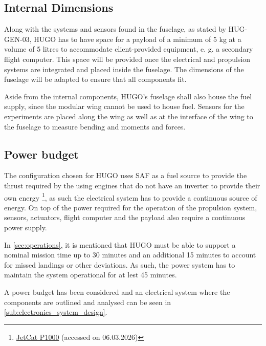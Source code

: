 \subsection{Internal Dimensions}
Along with the systems and sensors found in the fuselage, as stated by HUG-GEN-03, HUGO has to have space for a payload of a minimum of 5 kg at a volume of 5 litres to accommodate client-provided equipment, e. g. a secondary flight computer. This space will be provided once the electrical and propulsion systems are integrated and placed inside the fuselage. The dimensions of the fuselage will be adapted to ensure that all components fit.

Aside from the internal components, HUGO's fuselage shall also house the fuel supply, since the modular wing cannot be used to house fuel. Sensors for the experiments are placed along the wing as well as at the interface of the wing to the fuselage to measure bending and moments and forces. 


\subsection{Power budget}
The configuration chosen for HUGO uses SAF as a fuel source to provide the thrust required by the using engines that do not have an inverter to provide their own energy \footnote{\href{https://www.jetcat.de/en/productdetails/produkte/jetcat/produkte/RC\%20ENGINES/Engines/p100_rx-bl}{JetCat P1000} (accessed on 06.03.2026)}, as such the electrical system has to provide a continuous source of energy. On top of the power required for the operation of the propulsion system, sensors, actuators, flight computer and the payload also require a continuous power supply. 

In \autoref{sec:operations}, it is mentioned that HUGO must be able to support a nominal mission time up to 30 minutes and an additional 15 minutes to account for missed landings or other deviations. As such, the power system has to maintain the system operational for at lest 45 minutes. 

A power budget has been considered and an electrical system where the components are outlined and analysed can be seen in \autoref{sub:electronics_system_design}.




